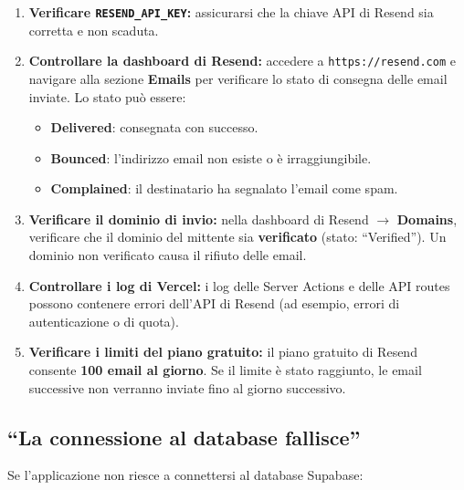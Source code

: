 \documentclass[a4paper,11pt,oneside]{book}
\begin{document}
\begin{enumerate}[leftmargin=1.5em]
  \item \textbf{Verificare \texttt{RESEND\_API\_KEY}:} assicurarsi che la chiave API di Resend sia corretta e non scaduta.
  \item \textbf{Controllare la dashboard di Resend:} accedere a \texttt{https://resend.com} e navigare alla sezione \textbf{Emails} per verificare lo stato di consegna delle email inviate. Lo stato pu\`o essere:
    \begin{itemize}
      \item \textbf{Delivered}: consegnata con successo.
      \item \textbf{Bounced}: l'indirizzo email non esiste o \`e irraggiungibile.
      \item \textbf{Complained}: il destinatario ha segnalato l'email come spam.
    \end{itemize}
  \item \textbf{Verificare il dominio di invio:} nella dashboard di Resend $\rightarrow$ \textbf{Domains}, verificare che il dominio del mittente sia \textbf{verificato} (stato: ``Verified''). Un dominio non verificato causa il rifiuto delle email.
  \item \textbf{Controllare i log di Vercel:} i log delle Server Actions e delle API routes possono contenere errori dell'API di Resend (ad esempio, errori di autenticazione o di quota).
  \item \textbf{Verificare i limiti del piano gratuito:} il piano gratuito di Resend consente \textbf{100 email al giorno}. Se il limite \`e stato raggiunto, le email successive non verranno inviate fino al giorno successivo.
\end{enumerate}

\subsection{``La connessione al database fallisce''}

Se l'applicazione non riesce a connettersi al database Supabase:
\end{document}
